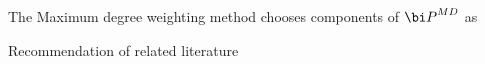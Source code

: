 The Maximum degree weighting method chooses components of ${\bi P}^{MD}$ as












\chap Recommendation of related literature





